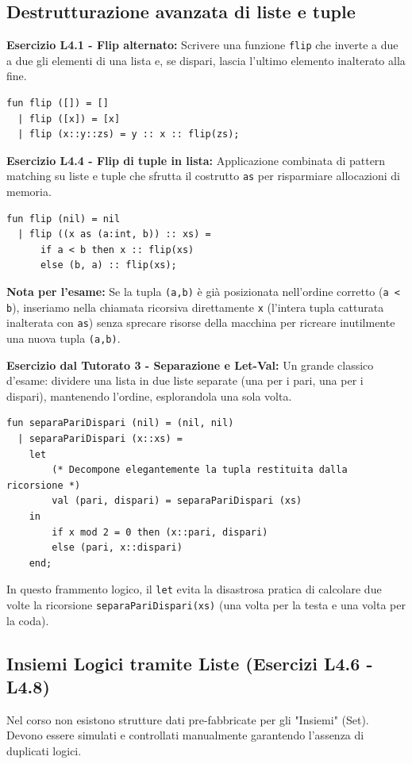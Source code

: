 \documentclass[12pt, a4paper]{article}
\begin{document}
\subsection{Destrutturazione avanzata di liste e tuple}

\textbf{Esercizio L4.1 - Flip alternato:}
Scrivere una funzione \texttt{flip} che inverte a due a due gli elementi di una lista e, se dispari, lascia l'ultimo elemento inalterato alla fine.
\begin{verbatim}
fun flip ([]) = []
  | flip ([x]) = [x]
  | flip (x::y::zs) = y :: x :: flip(zs);
\end{verbatim}

\textbf{Esercizio L4.4 - Flip di tuple in lista:}
Applicazione combinata di pattern matching su liste e tuple che sfrutta il costrutto \texttt{as} per risparmiare allocazioni di memoria.
\begin{verbatim}
fun flip (nil) = nil
  | flip ((x as (a:int, b)) :: xs) = 
      if a < b then x :: flip(xs) 
      else (b, a) :: flip(xs);
\end{verbatim}
\textbf{Nota per l'esame:} Se la tupla \texttt{(a,b)} è già posizionata nell'ordine corretto (\texttt{a < b}), inseriamo nella chiamata ricorsiva direttamente \texttt{x} (l'intera tupla catturata inalterata con \texttt{as}) senza sprecare risorse della macchina per ricreare inutilmente una nuova tupla \texttt{(a,b)}.

\textbf{Esercizio dal Tutorato 3 - Separazione e Let-Val:}
Un grande classico d'esame: dividere una lista in due liste separate (una per i pari, una per i dispari), mantenendo l'ordine, esplorandola una sola volta.
\begin{verbatim}
fun separaPariDispari (nil) = (nil, nil)
  | separaPariDispari (x::xs) =
    let
        (* Decompone elegantemente la tupla restituita dalla ricorsione *)
        val (pari, dispari) = separaPariDispari (xs)
    in
        if x mod 2 = 0 then (x::pari, dispari)
        else (pari, x::dispari)
    end;
\end{verbatim}
In questo frammento logico, il \texttt{let} evita la disastrosa pratica di calcolare due volte la ricorsione \texttt{separaPariDispari(xs)} (una volta per la testa e una volta per la coda).

\newpage

\subsection{Insiemi Logici tramite Liste (Esercizi L4.6 - L4.8)}
Nel corso non esistono strutture dati pre-fabbricate per gli "Insiemi" (Set). Devono essere simulati e controllati manualmente garantendo l'assenza di duplicati logici.
\end{document}
